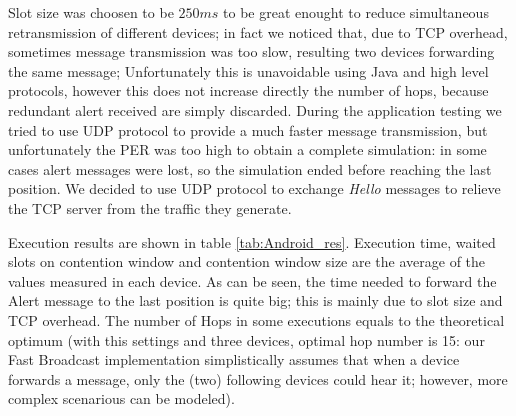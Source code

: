 Slot size was choosen to be $250ms$ to be great enought to reduce simultaneous retransmission of different devices; in fact we noticed that, due to TCP overhead, sometimes message transmission was too slow, resulting two devices forwarding the same message; Unfortunately this is unavoidable using Java and high level protocols, however this does not increase directly the number of hops, because redundant alert received are simply discarded.
During the application testing we tried to use UDP protocol to provide a much faster message transmission, but unfortunately the PER was too high to obtain a complete simulation: in some cases alert messages were lost, so the simulation ended before reaching the last position. We decided to use UDP protocol to exchange \textit{Hello} messages to relieve the TCP server from the traffic they generate.

Execution results are shown in table \ref{tab:Android_res}. Execution time, waited slots on contention window and contention window size are the average of the values measured in each device. As can be seen, the time needed to forward the Alert message to the last position is quite big; this is mainly due to slot size and TCP overhead. The number of Hops in some executions equals to the theoretical optimum (with this settings and three devices, optimal hop number is 15: our Fast Broadcast implementation simplistically assumes that when a device forwards a message, only the (two) following devices could hear it; however, more complex scenarious can be modeled).

